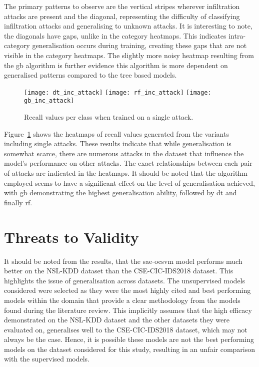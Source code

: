 The primary patterns to observe are the vertical stripes wherever infiltration
attacks are present and the diagonal, representing the difficulty of
classifying infiltration attacks and generalising to unknown attacks. It is
interesting to note, the diagonals have gaps, unlike in the category heatmaps.
This indicates intra-category generalisation occurs during training, creating
these gaps that are not visible in the category heatmaps. The slightly more
noisy heatmap resulting from the \gls{gb} algorithm is further evidence this
algorithm is more dependent on generalised patterns compared to the tree based
models.

\begin{figure}[htbp]
    \centering
    \texttt{[image: dt\_inc\_attack]}
    \texttt{[image: rf\_inc\_attack]}
    \texttt{[image: gb\_inc\_attack]}
    \caption[Single Individual Attack Results]{Recall values per class when trained on a single attack.\label{fig:inc_att}}
\end{figure}
%

Figure~\ref{fig:inc_att} shows the heatmaps of recall values generated from the
variants including single attacks. These results indicate that while
generalisation is somewhat scarce, there are numerous attacks in the dataset
that influence the model's performance on other attacks. The exact
relationships between each pair of attacks are indicated in the heatmaps. It
should be noted that the algorithm employed seems to have a significant effect
on the level of generalisation achieved, with \gls{gb} demonstrating the
highest generalisation ability, followed by \gls{dt} and finally \gls{rf}.

\section{Threats to Validity}%
\label{sec:threats}
It should be noted from the results, that the \gls{sae}-\gls{ocsvm} model
performs much better on the NSL-KDD dataset than the CSE-CIC-IDS2018
dataset. This highlights the issue of generalisation across datasets. The
unsupervised models considered were selected as they were the most highly cited
and best performing models within the domain that provide a clear methodology
from the models found during the literature review. This implicitly assumes
that the high efficacy demonstrated on the NSL-KDD dataset and the other
datasets they were evaluated on, generalises well to the CSE-CIC-IDS2018
dataset, which may not always be the case. Hence, it is possible these models
are not the best performing models on the dataset considered for this study,
resulting in an unfair comparison with the supervised models.

